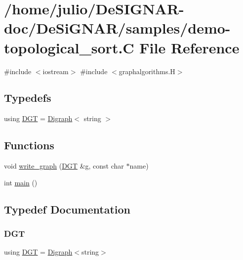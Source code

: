 \hypertarget{demo-topological__sort_8_c}{}\section{/home/julio/\+De\+S\+I\+G\+N\+A\+R-\/doc/\+De\+Si\+G\+N\+A\+R/samples/demo-\/topological\+\_\+sort.C File Reference}
\label{demo-topological__sort_8_c}
{\ttfamily \#include $<$iostream$>$}\newline
{\ttfamily \#include $<$graphalgorithms.\+H$>$}\newline
\subsection*{Typedefs}
\begin{DoxyCompactItemize}
\item 
using \hyperlink{demo-topological__sort_8_c_a8f123599e859454680bf37e203c0b18b}{D\+GT} = \hyperlink{class_designar_1_1_digraph}{Digraph}$<$ string $>$
\end{DoxyCompactItemize}
\subsection*{Functions}
\begin{DoxyCompactItemize}
\item 
void \hyperlink{demo-topological__sort_8_c_ab82a33da73b0e5278780967809b0791d}{write\+\_\+graph} (\hyperlink{demo-buildgraph_8_c_ae73e956c2a8cf0a58255aa6b659985e0}{D\+GT} \&g, const char $\ast$name)
\item 
int \hyperlink{demo-topological__sort_8_c_ae66f6b31b5ad750f1fe042a706a4e3d4}{main} ()
\end{DoxyCompactItemize}


\subsection{Typedef Documentation}
\mbox{\label{demo-topological__sort_8_c_a8f123599e859454680bf37e203c0b18b}} 
\subsubsection{\texorpdfstring{D\+GT}{DGT}}
{\footnotesize\ttfamily using \hyperlink{demo-buildgraph_8_c_ae73e956c2a8cf0a58255aa6b659985e0}{D\+GT} =  \hyperlink{class_designar_1_1_digraph}{Digraph}$<$string$>$}



